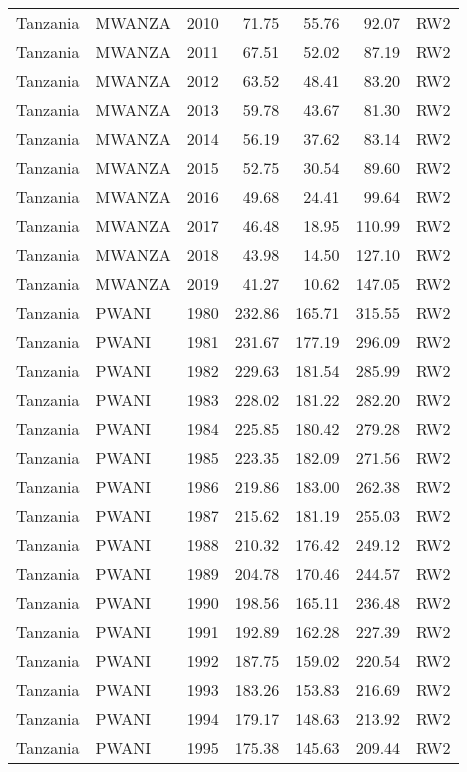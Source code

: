 \begin{longtable}{lllrrrl}
  Tanzania & MWANZA & 2010 & 71.75 & 55.76 & 92.07 & RW2 \\ 
  Tanzania & MWANZA & 2011 & 67.51 & 52.02 & 87.19 & RW2 \\ 
  Tanzania & MWANZA & 2012 & 63.52 & 48.41 & 83.20 & RW2 \\ 
  Tanzania & MWANZA & 2013 & 59.78 & 43.67 & 81.30 & RW2 \\ 
  Tanzania & MWANZA & 2014 & 56.19 & 37.62 & 83.14 & RW2 \\ 
  Tanzania & MWANZA & 2015 & 52.75 & 30.54 & 89.60 & RW2 \\ 
  Tanzania & MWANZA & 2016 & 49.68 & 24.41 & 99.64 & RW2 \\ 
  Tanzania & MWANZA & 2017 & 46.48 & 18.95 & 110.99 & RW2 \\ 
  Tanzania & MWANZA & 2018 & 43.98 & 14.50 & 127.10 & RW2 \\ 
  Tanzania & MWANZA & 2019 & 41.27 & 10.62 & 147.05 & RW2 \\ 
  Tanzania & PWANI & 1980 & 232.86 & 165.71 & 315.55 & RW2 \\ 
  Tanzania & PWANI & 1981 & 231.67 & 177.19 & 296.09 & RW2 \\ 
  Tanzania & PWANI & 1982 & 229.63 & 181.54 & 285.99 & RW2 \\ 
  Tanzania & PWANI & 1983 & 228.02 & 181.22 & 282.20 & RW2 \\ 
  Tanzania & PWANI & 1984 & 225.85 & 180.42 & 279.28 & RW2 \\ 
  Tanzania & PWANI & 1985 & 223.35 & 182.09 & 271.56 & RW2 \\ 
  Tanzania & PWANI & 1986 & 219.86 & 183.00 & 262.38 & RW2 \\ 
  Tanzania & PWANI & 1987 & 215.62 & 181.19 & 255.03 & RW2 \\ 
  Tanzania & PWANI & 1988 & 210.32 & 176.42 & 249.12 & RW2 \\ 
  Tanzania & PWANI & 1989 & 204.78 & 170.46 & 244.57 & RW2 \\ 
  Tanzania & PWANI & 1990 & 198.56 & 165.11 & 236.48 & RW2 \\ 
  Tanzania & PWANI & 1991 & 192.89 & 162.28 & 227.39 & RW2 \\ 
  Tanzania & PWANI & 1992 & 187.75 & 159.02 & 220.54 & RW2 \\ 
  Tanzania & PWANI & 1993 & 183.26 & 153.83 & 216.69 & RW2 \\ 
  Tanzania & PWANI & 1994 & 179.17 & 148.63 & 213.92 & RW2 \\ 
  Tanzania & PWANI & 1995 & 175.38 & 145.63 & 209.44 & RW2 \\ 

\end{longtable}
